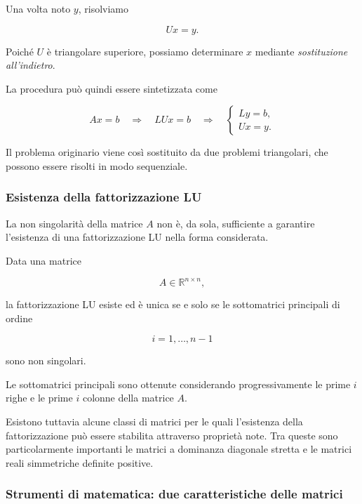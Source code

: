 Una volta noto $y$, risolviamo

\begin{equation*}
    Ux=y.
    \label{eq:back-substitution}
\end{equation*}

Poiché $U$ è triangolare superiore, possiamo determinare $x$
mediante \emph{sostituzione all'indietro}.

La procedura può quindi essere sintetizzata come

\begin{equation*}
Ax=b
\quad\Longrightarrow\quad
LUx=b
\quad\Longrightarrow\quad
\begin{cases}
Ly=b,\\
Ux=y.
\end{cases}
\end{equation*}

Il problema originario viene così sostituito da due problemi
triangolari, che possono essere risolti in modo sequenziale.


\subsubsection{Esistenza della fattorizzazione LU}

La non singolarità della matrice $A$ non è, da sola, sufficiente
a garantire l'esistenza di una fattorizzazione LU nella forma
considerata.

Data una matrice

\begin{equation*}
    A\in\mathbb{R}^{n\times n},
\end{equation*}

la fattorizzazione LU esiste ed è unica se e solo se le
sottomatrici principali di ordine

\begin{equation*}
    i=1,\ldots,n-1
\end{equation*}

sono non singolari.

Le sottomatrici principali sono ottenute considerando
progressivamente le prime $i$ righe e le prime $i$ colonne della
matrice $A$.

Esistono tuttavia alcune classi di matrici per le quali l'esistenza
della fattorizzazione può essere stabilita attraverso proprietà
note. Tra queste sono particolarmente importanti le matrici a
dominanza diagonale stretta e le matrici reali simmetriche definite
positive.


\subsubsection{Strumenti di matematica: due caratteristiche delle matrici}

